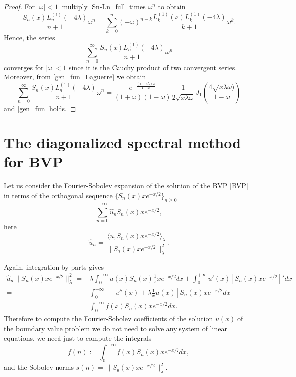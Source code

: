 \documentclass[reqno,10pt]{amsart}
\theoremstyle{plain}
\numberwithin{equation}{section}
\numberwithin{figure}{section}
\begin{document}
\begin{proof}
For $|\omega| < 1$, multiply \eqref{Sn-Ln_full} times $\omega^n$ to obtain
$$
\frac{S_{n}(x)L^{(1)}_{n}(-4\lambda)}{n+1} \omega^n =  \sum_{k=0}^{n} (-\omega)^{n-k} \frac{L_{k}^{(1)}(x)L^{(1)}_{k}(-4\lambda)}{k+1} \omega^k.
$$
Hence, the series 
$$
\sum_{n=0}^{\infty} \frac{S_{n}(x)L^{(1)}_{n}(-4\lambda)}{n+1} \omega^n
$$
converges for $|\omega| < 1$ since it is the Cauchy product of two convergent series. 
Moreover, from \eqref{gen_fun_Laguerre} we obtain
$$
\sum_{n=0}^{\infty} \frac{S_{n}(x)L^{(1)}_{n}(-4\lambda)}{n+1} \omega^n  =
\frac{e^{- \frac{(x-4 \lambda)\omega}{1-\omega}}}{(1+\omega)(1-\omega)}  \frac{1}{2\sqrt{x\lambda\omega}} J_{1} \left(  \frac{4\sqrt{x\lambda\omega)}}{1-\omega}\right)
$$
and \eqref{gen_fun} holds.
\end{proof}

\section{
The diagonalized spectral method for BVP
}

Let us consider the Fourier-Sobolev expansion of the solution of the BVP \eqref{BVP} in terms of the orthogonal sequence $\{ S_{n}(x) x e^{-x/2}\}_{n\geqslant0}$
$$
\sum_{n=0}^{+\infty} \widehat{u}_{n}  S_{n}(x) x e^{-x/2},
$$
here
$$
\widehat{u}_n
=\frac{\langle u,  S_{n}(x) x e^{-x/2}\rangle_\lambda}{\| S_{n}(x) x e^{-x/2}\|^2_\lambda}.
$$

Again, integration by parts gives
\begin{align*}
\widehat{u}_n {\| S_{n}(x) x e^{-x/2}\|^2_\lambda}
=& \lambda \int_{0}^{+\infty} u(x) S_n(x) \frac{1}{x} x e^{-x/2}dx + \int_{0}^{+\infty} u'(x)[S_n(x) x e^{-x/2}]'dx\\
=&\int_{0}^{+\infty} [-u''(x)+\lambda \frac{1}{x} u(x)] S_n(x) x e^{-x/2}dx\\
=&\int_{0}^{+\infty} f(x) S_n(x) x e^{-x/2}dx.
\end{align*}
Therefore to compute  the Fourier-Sobolev coefficients of the solution $u(x)$ of the boundary value problem we do not need to solve any system of linear equations, we need just to compute the integrals
\[  f(n) := \int_{0}^{+\infty} f(x) S_n(x) x e^{-x/2}dx,
\]
and the Sobolev norms \(s(n) = \| S_{n}(x) x e^{-x/2}\|^2_\lambda\).
\end{document}
